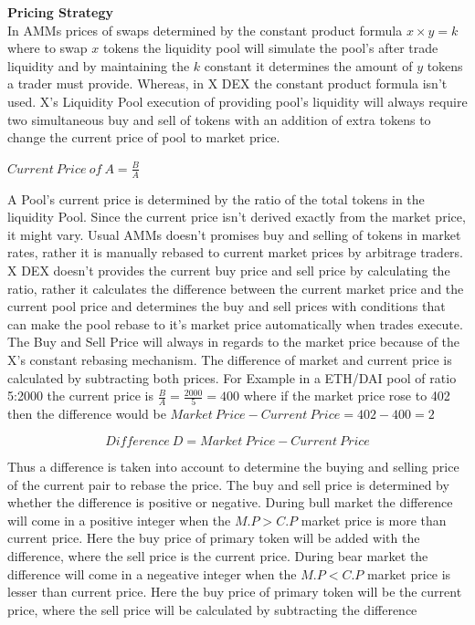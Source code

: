 \documentclass[letterpaper,11pt]{article}
\begin{document}
\textbf{Pricing Strategy}\\

In AMMs prices of swaps determined by the constant product formula $x \times  y=k$ where to swap $x$ tokens the liquidity pool will simulate the pool's after trade liquidity and by maintaining the $k$ constant it determines the amount of $y$ tokens a trader must provide. Whereas, in X DEX the constant product formula isn't used. X's Liquidity Pool execution of providing pool's liquidity will always require two simultaneous buy and sell of tokens with an addition of extra tokens to change the current price of pool to market price.


\begin{center}
$Current\:Price\:of\:A = \frac{B}{A}$
\end{center}

A Pool's current price is determined by the ratio of the total tokens in the liquidity Pool. Since the current price isn't derived exactly from the market price, it might vary. Usual AMMs doesn't promises buy and selling of tokens in market rates, rather it is manually rebased to current market prices by arbitrage traders. X DEX doesn't provides the current buy price and sell price by calculating the ratio, rather it calculates the difference between the current market price and the current pool price and determines the buy and sell prices with conditions that can make the pool rebase to it's market price automatically when trades execute.\\

The Buy and Sell Price will always in regards to the market price because of the X's constant rebasing mechanism. The difference of market and current price is calculated by subtracting both prices. For Example in a ETH/DAI pool of ratio 5:2000 the current price is $\frac{B}{A}=\frac{2000}{5}=400$ where if the market price rose to 402 then the difference would be $Market\:Price - Current\:Price=402-400=2$

\[Difference\:D = Market\:Price - Current\:Price\]



Thus a difference is taken into account to determine the buying and selling price of the current pair to rebase the price. The buy and sell price is determined by whether the difference is positive or negative. During bull market the difference will come in a positive integer when the $M.P>C.P$ market price is more than current price. Here the buy price of primary token will be added with the difference, where the sell price is the current price. During bear market the difference will come in a negeative integer when the $M.P<C.P$ market price is lesser than current price. Here the buy price of primary token will be the current price, where the sell price will be calculated by subtracting the difference\\
\end{document}
